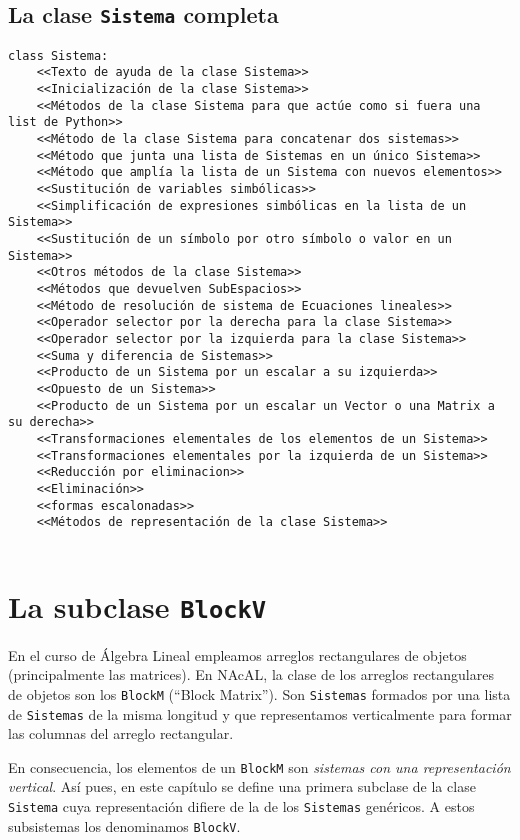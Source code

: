 \documentclass[11pt]{report}
\begin{document}
\clearpage

\section{La clase \texttt{Sistema} completa}
\label{sec:org7cfe956}

\begin{verbatim}
class Sistema:
    <<Texto de ayuda de la clase Sistema>>
    <<Inicialización de la clase Sistema>>
    <<Métodos de la clase Sistema para que actúe como si fuera una list de Python>>
    <<Método de la clase Sistema para concatenar dos sistemas>>
    <<Método que junta una lista de Sistemas en un único Sistema>>
    <<Método que amplía la lista de un Sistema con nuevos elementos>>
    <<Sustitución de variables simbólicas>>
    <<Simplificación de expresiones simbólicas en la lista de un Sistema>>
    <<Sustitución de un símbolo por otro símbolo o valor en un Sistema>>
    <<Otros métodos de la clase Sistema>>
    <<Métodos que devuelven SubEspacios>>
    <<Método de resolución de sistema de Ecuaciones lineales>>
    <<Operador selector por la derecha para la clase Sistema>>
    <<Operador selector por la izquierda para la clase Sistema>>
    <<Suma y diferencia de Sistemas>>
    <<Producto de un Sistema por un escalar a su izquierda>>
    <<Opuesto de un Sistema>>
    <<Producto de un Sistema por un escalar un Vector o una Matrix a su derecha>>
    <<Transformaciones elementales de los elementos de un Sistema>>
    <<Transformaciones elementales por la izquierda de un Sistema>>
    <<Reducción por eliminacion>>
    <<Eliminación>>
    <<formas escalonadas>>
    <<Métodos de representación de la clase Sistema>>
    
\end{verbatim}


\chapter{La subclase \texttt{BlockV}}
\label{sec:orge975439}

En el curso de Álgebra Lineal empleamos arreglos rectangulares de
objetos (principalmente las matrices). En NAcAL, la clase de los
arreglos rectangulares de objetos son los \texttt{BlockM} (``Block
Matrix''). Son \texttt{Sistemas} formados por una lista de \texttt{Sistemas} de la
misma longitud y que representamos verticalmente para formar las
columnas del arreglo rectangular.

En consecuencia, los elementos de un \texttt{BlockM} son \emph{sistemas con una
representación vertical}. Así pues, en este capítulo se define una
primera subclase de la clase \texttt{Sistema} cuya representación difiere de
la de los \texttt{Sistemas} genéricos. A estos subsistemas los denominamos
\texttt{BlockV}.
\end{document}
